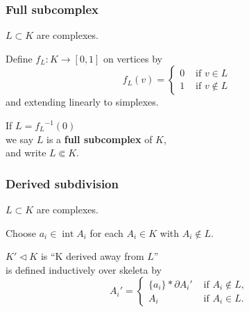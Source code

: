 \documentclass[14pt]{beamer}
\newcommand{\join}{\ast}
\newcommand{\subdivided}{\triangleleft}
\newcommand{\fullsubcomplex}{\Subset}
\DeclareMathOperator{\interior}{int}
\newcommand{\setbackgroundpicture}[1]{%
\usebackgroundtemplate{
\begin{pgfpicture}{0in}{0in}{\paperwidth}{\paperheight}
\pgfputat{\pgfxy(0,0)}{\texttt{[image: \#1]}}
\color{white}
\pgfsetfillopacity{0.8}
\pgfrect[fill]{\pgfxy(0,0)}{\pgfpoint{\paperwidth}{\paperheight}}
\end{pgfpicture}
}
}
\newcommand{\clearbackgroundpicture}{\usebackgroundtemplate{}}
\begin{document}


  

\begin{frame}
  \frametitle{Full subcomplex}
  
    $L \subset K$ are complexes.

    \vfill
    Define $f_L : K \to [0,1]$ on vertices by
    $$
    f_L(v) = \begin{cases}
      0 & \mbox{ if $v \in L$ } \\
      1 & \mbox{ if $v \not\in L$ } 
    \end{cases}
    $$
    and extending linearly to simplexes. 

    \vfill
    If $L = {f_L}^{-1}(0)$ \\
    we say $L$ is a \textbf{full subcomplex} of $K$, \\
    and write $L \fullsubcomplex K$.

\end{frame}

\begin{frame}
  \frametitle{Derived subdivision}

  $L \subset K$ are complexes.

  \vfill

  Choose $a_i \in \interior A_i$ for each $A_i \in K$ with $A_i
  \not\in L$.

  \vfill
  
  $K' \subdivided K$ is ``K derived away from $L$'' \\
  is defined inductively over skeleta by
  $$
  {A_i}'  = \begin{cases}
    \{ a_i \} \join \partial {A_i}' & \mbox{ if $A_i \not\in L$, } \\
    A_i & \mbox{ if $A_i \in L$.}
    \end{cases}
  $$


\end{frame}
\end{document}
